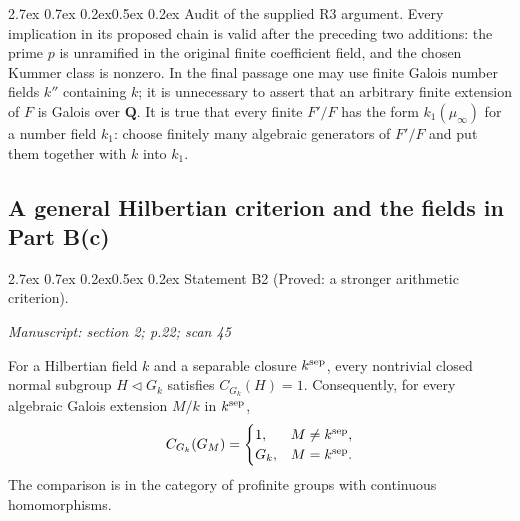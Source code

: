 \documentclass[11pt,a4paper]{article}
\makeatletter
\newcommand{\passage}[1]{\par\smallskip\noindent\textit{Manuscript: #1}\par\smallskip}
\renewcommand\paragraph{\@startsection{paragraph}{4}{\z@}%
  {2.7ex \@plus 0.7ex \@minus 0.2ex}{0.5ex \@plus 0.2ex}%
  {\normalfont\normalsize\bfseries}}
\makeatother
\begin{document}
\paragraph{Audit of the supplied R3 argument.}
Every implication in its proposed chain is valid after the preceding two
additions: the prime $p$ is unramified in the original finite coefficient
field, and the chosen Kummer class is nonzero. In the final passage one may
use finite Galois number fields $k''$ containing $k$; it is unnecessary to
assert that an arbitrary finite extension of $F$ is Galois over
$\mathbf Q$. It is true that every finite $F'/F$ has the form
$k_1(\mu_\infty)$ for a number field $k_1$: choose finitely many algebraic
generators of $F'/F$ and put them together with $k$ into $k_1$.

\subsection{A general Hilbertian criterion and the fields in Part B(c)}

\paragraph{Statement B2 (Proved: a stronger arithmetic criterion).}\label{res:B2}
\passage{section 2; p.22; scan 45}

For a Hilbertian field $k$ and a separable closure $k^{\rm sep}$, every
nontrivial closed normal subgroup $H\triangleleft G_k$ satisfies
$C_{G_k}(H)=1$. Consequently, for every algebraic Galois extension
$M/k$ in $k^{\rm sep}$,
\[
 C_{G_k}(G_M)=
 \begin{cases}
 1,&M\ne k^{\rm sep},\\
 G_k,&M=k^{\rm sep}.
 \end{cases}
\]
The comparison is in the category of profinite groups with continuous
homomorphisms.
\end{document}
